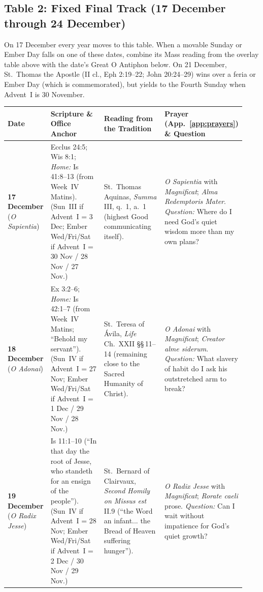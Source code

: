 \subsection{Table 2: Fixed Final Track (17 December through 24 December)}

On 17 December every year moves to this table. When a movable Sunday or Ember
Day falls on one of these dates, combine its Mass reading from the overlay
table above with the date's Great O Antiphon below. On 21 December, St.~Thomas
the Apostle (II cl., Eph 2:19--22; John 20:24--29) wins over a feria or Ember
Day (which is commemorated), but yields to the Fourth Sunday when Advent~I is
30 November.

{\footnotesize
\begin{longtable}{>{\raggedright\arraybackslash}p{0.14\linewidth}>{\raggedright\arraybackslash}p{0.25\linewidth}>{\raggedright\arraybackslash}p{0.28\linewidth}>{\raggedright\arraybackslash}p{0.26\linewidth}}
\toprule
\textbf{Date} & \textbf{Scripture \& Office Anchor} & \textbf{Reading from the Tradition} & \textbf{Prayer (App.~\ref{app:prayers}) \& Question}\\
\midrule
\endhead
\textbf{17 December} (\textit{O Sapientia}) & Ecclus 24:5; Wis 8:1; \textit{Home:} Is 41:8--13 (from Week~IV Matins). (Sun~III if Advent~I = 3 Dec; Ember Wed/Fri/Sat if Advent~I = 30 Nov / 28 Nov / 27 Nov.) & St.~Thomas Aquinas, \textit{Summa} III, q.~1, a.~1 (highest Good communicating itself). & \textit{O Sapientia} with \textit{Magnificat}; \textit{Alma Redemptoris Mater}. \textit{Question:} Where do I need God's quiet wisdom more than my own plans?\\
\textbf{18 December} (\textit{O Adonai}) & Ex 3:2--6; \textit{Home:} Is 42:1--7 (from Week~IV Matins; ``Behold my servant''). (Sun~IV if Advent~I = 27 Nov; Ember Wed/Fri/Sat if Advent~I = 1 Dec / 29 Nov / 28 Nov.) & St.~Teresa of \'Avila, \textit{Life} Ch.~XXII \S\S\,11--14 (remaining close to the Sacred Humanity of Christ). & \textit{O Adonai} with \textit{Magnificat}; \textit{Creator alme siderum}. \textit{Question:} What slavery of habit do I ask his outstretched arm to break?\\
\textbf{19 December} (\textit{O Radix Jesse}) & Is 11:1--10 (``In that day the root of Jesse, who standeth for an ensign of the people''). (Sun~IV if Advent~I = 28 Nov; Ember Wed/Fri/Sat if Advent~I = 2 Dec / 30 Nov / 29 Nov.) & St.~Bernard of Clairvaux, \textit{Second Homily on Missus est} II.9 (``the Word an infant... the Bread of Heaven suffering hunger''). & \textit{O Radix Jesse} with \textit{Magnificat}; \textit{Rorate caeli} prose. \textit{Question:} Can I wait without impatience for God's quiet growth?\\

\end{longtable}}
